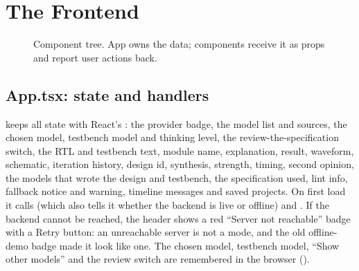 \chapter{The Frontend}
\label{ch:frontend}

\begin{figure}[H]
\centering
{}
\caption{Component tree. App owns the data; components receive it as props and report user actions back.}
\end{figure}

\section{App.tsx: state and handlers}

 keeps all state with React's : the provider badge, the model list and sources, the chosen model, testbench model and thinking level, the review-the-specification switch, the RTL and testbench text, module name, explanation, result, waveform, schematic, iteration history, design id, synthesis, strength, timing, second opinion, the models that wrote the design and testbench, the specification used, lint info, fallback notice and warning, timeline messages and saved projects. On first load it calls  (which also tells it whether the backend is live or offline) and . If the backend cannot be reached, the header shows a red ``Server not reachable'' badge with a Retry button: an unreachable server is not a mode, and the old offline-demo badge made it look like one. The chosen model, testbench model, ``Show other models'' and the review switch are remembered in the browser ().

